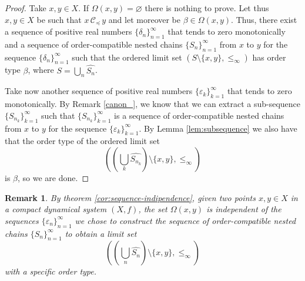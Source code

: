 \documentclass[10pt,a4paper]{article}
\theoremstyle{definition}
\theoremstyle{remark}
\theoremstyle{plain}
\newtheorem{thm}[defi]{Theorem}
\newtheorem{rem}[defi]{Remark}
\begin{document}
\begin{proof}
    Take $x,y\in X$. If $\Omega(x,y)=\varnothing$ there is nothing to prove.
    Let thus $x,y\in X$ be such that $x\,\mathcal{C}_\preceq\,y$ and let moreover be $\beta\in\Omega(x,y)$. Thus, there exist a sequence of positive real numbers $\{\delta_n\}_{n=1}^\infty$ that tends to zero monotonically and a sequence of order-compatible nested chains $\{S_n\}_{n=1}^\infty$ from $x$ to $y$ for the sequence $\{\delta_n\}_{n=1}^\infty$ such that the ordered limit set $(S\setminus\{x,y\},\le_\infty)$ has order type $\beta$, where $S=\bigcup_n\widehat{S_n}$.

    Take now another sequence of positive real numbers $\{\varepsilon_k\}_{k=1}^{\infty}$ that tends to zero monotonically. By Remark \ref{canon_}, we know that we can extract a sub-sequence $\{S_{n_k}\}_{k=1}^{\infty}$ such that $\{S_{n_k}\}_{k=1}^{\infty}$ is a sequence of order-compatible nested chains from $x$ to $y$ for the sequence $\{\varepsilon_k\}_{k=1}^{\infty}$. By Lemma \ref{lem:subsequence} we also have that the order type of the ordered limit set $$\left(\left(\bigcup_k\widehat{S_{n_k}}\right)\setminus\{x,y\},\le_\infty\right)$$ is $\beta$, so we are done.
\end{proof}

\begin{rem}\label{indep_eps_}
    By theorem \ref{cor:sequence-indipendence}, given two points $x,y\in X$ in a compact dynamical system $(X,f)$, the set $\Omega(x,y)$ is independent of the sequences $\{\varepsilon_n\}_{n=1}^{\infty}$ we chose to construct the sequence of order-compatible nested chains $\{S_n\}_{n=1}^{\infty}$ to obtain a limit set $$\left(\left(\bigcup_n\widehat{S_{n}}\right)\setminus\{x,y\},\le_\infty\right)$$ with a specific order type.   
\end{rem}



$$
$$
\end{document}
